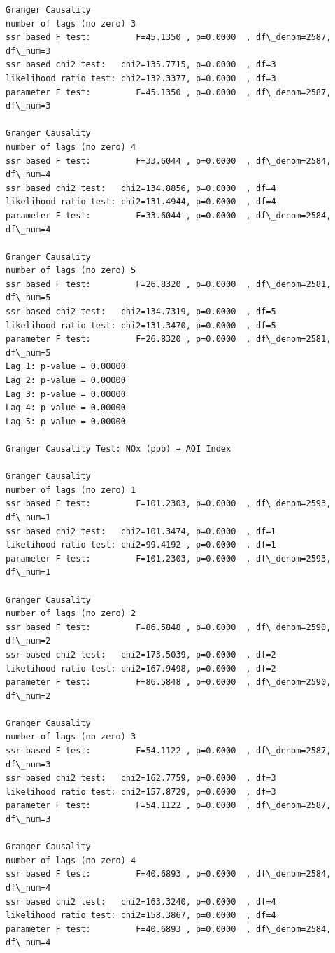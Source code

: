 \documentclass[11pt]{article}
\begin{document}
\begin{Verbatim}[commandchars=\\\{\}]
Granger Causality
number of lags (no zero) 3
ssr based F test:         F=45.1350 , p=0.0000  , df\_denom=2587, df\_num=3
ssr based chi2 test:   chi2=135.7715, p=0.0000  , df=3
likelihood ratio test: chi2=132.3377, p=0.0000  , df=3
parameter F test:         F=45.1350 , p=0.0000  , df\_denom=2587, df\_num=3

Granger Causality
number of lags (no zero) 4
ssr based F test:         F=33.6044 , p=0.0000  , df\_denom=2584, df\_num=4
ssr based chi2 test:   chi2=134.8856, p=0.0000  , df=4
likelihood ratio test: chi2=131.4944, p=0.0000  , df=4
parameter F test:         F=33.6044 , p=0.0000  , df\_denom=2584, df\_num=4

Granger Causality
number of lags (no zero) 5
ssr based F test:         F=26.8320 , p=0.0000  , df\_denom=2581, df\_num=5
ssr based chi2 test:   chi2=134.7319, p=0.0000  , df=5
likelihood ratio test: chi2=131.3470, p=0.0000  , df=5
parameter F test:         F=26.8320 , p=0.0000  , df\_denom=2581, df\_num=5
Lag 1: p-value = 0.00000
Lag 2: p-value = 0.00000
Lag 3: p-value = 0.00000
Lag 4: p-value = 0.00000
Lag 5: p-value = 0.00000

Granger Causality Test: NOx (ppb) → AQI Index

Granger Causality
number of lags (no zero) 1
ssr based F test:         F=101.2303, p=0.0000  , df\_denom=2593, df\_num=1
ssr based chi2 test:   chi2=101.3474, p=0.0000  , df=1
likelihood ratio test: chi2=99.4192 , p=0.0000  , df=1
parameter F test:         F=101.2303, p=0.0000  , df\_denom=2593, df\_num=1

Granger Causality
number of lags (no zero) 2
ssr based F test:         F=86.5848 , p=0.0000  , df\_denom=2590, df\_num=2
ssr based chi2 test:   chi2=173.5039, p=0.0000  , df=2
likelihood ratio test: chi2=167.9498, p=0.0000  , df=2
parameter F test:         F=86.5848 , p=0.0000  , df\_denom=2590, df\_num=2

Granger Causality
number of lags (no zero) 3
ssr based F test:         F=54.1122 , p=0.0000  , df\_denom=2587, df\_num=3
ssr based chi2 test:   chi2=162.7759, p=0.0000  , df=3
likelihood ratio test: chi2=157.8729, p=0.0000  , df=3
parameter F test:         F=54.1122 , p=0.0000  , df\_denom=2587, df\_num=3

Granger Causality
number of lags (no zero) 4
ssr based F test:         F=40.6893 , p=0.0000  , df\_denom=2584, df\_num=4
ssr based chi2 test:   chi2=163.3240, p=0.0000  , df=4
likelihood ratio test: chi2=158.3867, p=0.0000  , df=4
parameter F test:         F=40.6893 , p=0.0000  , df\_denom=2584, df\_num=4


\end{Verbatim}
\end{document}
